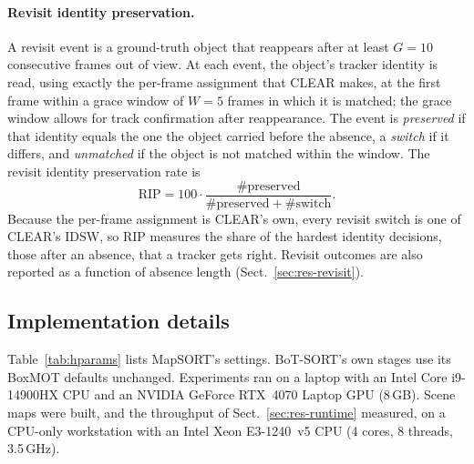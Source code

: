 \documentclass[pdflatex,sn-basic]{sn-jnl}%
\theoremstyle{thmstyleone}%
\newcommand{\RIP}{\mathrm{RIP}}
\begin{document}
\paragraph{Revisit identity preservation.} A revisit event is a ground-truth object that reappears after at least $G=10$ consecutive frames out of view. At each event, the object's tracker identity is read, using exactly the per-frame assignment that CLEAR makes, at the first frame within a grace window of $W=5$ frames in which it is matched; the grace window allows for track confirmation after reappearance. The event is \emph{preserved} if that identity equals the one the object carried before the absence, a \emph{switch} if it differs, and \emph{unmatched} if the object is not matched within the window. The revisit identity preservation rate is
\begin{equation}
\RIP = 100\cdot\frac{\#\text{preserved}}{\#\text{preserved}+\#\text{switch}}.
\end{equation}
Because the per-frame assignment is CLEAR's own, every revisit switch is one of CLEAR's IDSW, so RIP measures the share of the hardest identity decisions, those after an absence, that a tracker gets right. Revisit outcomes are also reported as a function of absence length (Sect.~\ref{sec:res-revisit}).

\subsection{Implementation details}\label{sec:impl}

Table~\ref{tab:hparams} lists MapSORT's settings. BoT-SORT's own stages use its BoxMOT defaults unchanged. Experiments ran on a laptop with an Intel Core i9-14900HX CPU and an NVIDIA GeForce RTX~4070 Laptop GPU (8\,GB). Scene maps were built, and the throughput of Sect.~\ref{sec:res-runtime} measured, on a CPU-only workstation with an Intel Xeon E3-1240~v5 CPU (4 cores, 8 threads, 3.5\,GHz).
\end{document}
